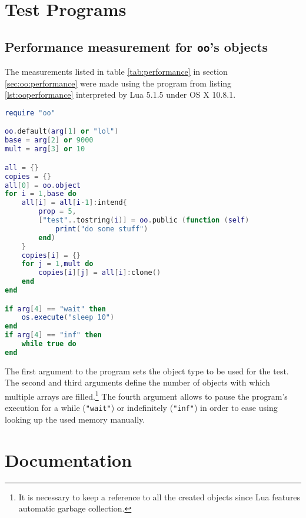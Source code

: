 \begin{appendices}

	\chapter{Test Programs}
	
	\section{Performance measurement for \texttt{oo}'s objects}
	\label{sec:app:ooperformance}
	
	The measurements listed in table \ref{tab:performance} in section \ref{sec:oo:performance} were made using the program from listing \ref{lst:ooperformance} interpreted by Lua 5.1.5 under OS X 10.8.1. 
	
\begin{lstlisting}[language=lua, caption={Test program for memory measurement of different object types}, label=lst:ooperformance, name=lst:ooperformance]
require "oo"

oo.default(arg[1] or "lol")
base = arg[2] or 9000
mult = arg[3] or 10

all = {}
copies = {}
all[0] = oo.object
for i = 1,base do
	all[i] = all[i-1]:intend{
		prop = 5,
		["test"..tostring(i)] = oo.public (function (self)
			print("do some stuff")
		end)
	}
	copies[i] = {}
	for j = 1,mult do
		copies[i][j] = all[i]:clone()
	end
end

if arg[4] == "wait" then
	os.execute("sleep 10")
end
if arg[4] == "inf" then
	while true do
end
\end{lstlisting}
	
	The first argument to the program sets the object type to be used for the test. The second and third arguments define the number of objects with which multiple arrays are filled.\footnote{It is necessary to keep a reference to all the created objects since Lua features automatic garbage collection.} The fourth argument allows to pause the program's execution for a while (\texttt{"wait"}) or indefinitely (\texttt{"inf"}) in order to ease using looking up the used memory manually.
	
	
	\chapter{Documentation}

\end{appendices}